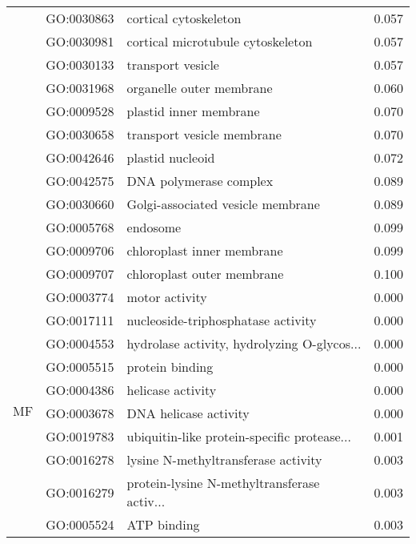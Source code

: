\begin{longtable}{lllr}
   & GO:0030863 &                        cortical cytoskeleton &         0.057 \\
   & GO:0030981 &            cortical microtubule cytoskeleton &         0.057 \\
   & GO:0030133 &                            transport vesicle &         0.057 \\
   & GO:0031968 &                     organelle outer membrane &         0.060 \\
   & GO:0009528 &                       plastid inner membrane &         0.070 \\
   & GO:0030658 &                   transport vesicle membrane &         0.070 \\
   & GO:0042646 &                             plastid nucleoid &         0.072 \\
   & GO:0042575 &                       DNA polymerase complex &         0.089 \\
   & GO:0030660 &            Golgi-associated vesicle membrane &         0.089 \\
   & GO:0005768 &                                     endosome &         0.099 \\
   & GO:0009706 &                   chloroplast inner membrane &         0.099 \\
   & GO:0009707 &                   chloroplast outer membrane &         0.100 \\
\cline{1-4}
\multirow{85}{*}{MF} & GO:0003774 &                               motor activity &         0.000 \\
   & GO:0017111 &           nucleoside-triphosphatase activity &         0.000 \\
   & GO:0004553 &  hydrolase activity, hydrolyzing O-glycos... &         0.000 \\
   & GO:0005515 &                              protein binding &         0.000 \\
   & GO:0004386 &                            helicase activity &         0.000 \\
   & GO:0003678 &                        DNA helicase activity &         0.000 \\
   & GO:0019783 &  ubiquitin-like protein-specific protease... &         0.001 \\
   & GO:0016278 &          lysine N-methyltransferase activity &         0.003 \\
   & GO:0016279 &  protein-lysine N-methyltransferase activ... &         0.003 \\
   & GO:0005524 &                                  ATP binding &         0.003 \\

\end{longtable}
